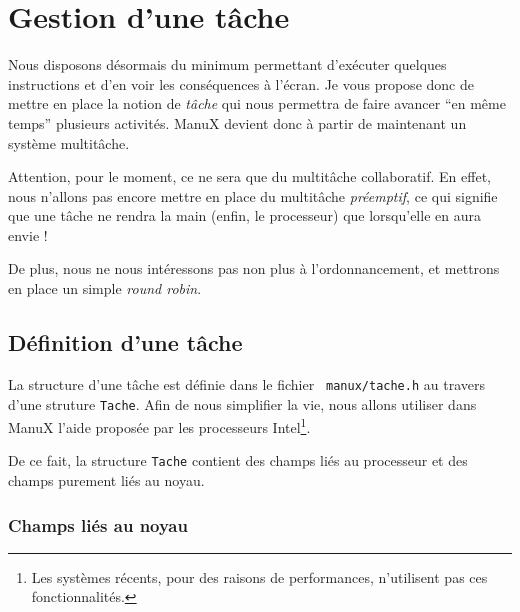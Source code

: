 \section{Gestion d'une tâche}

   Nous disposons désormais du minimum permettant d'exécuter quelques
instructions et d'en voir les conséquences à l'écran. Je vous propose
donc de mettre en place la notion de {\em tâche} qui nous permettra de
faire avancer ``en même temps'' plusieurs activités. ManuX devient
donc à partir de maintenant un système multitâche.

   Attention, pour le moment, ce ne sera que du multitâche
collaboratif. En effet, nous n'allons pas encore mettre en place du
multitâche {\em préemptif}, ce qui signifie que une tâche ne rendra la
main (enfin, le processeur) que lorsqu'elle en aura envie !

   De plus, nous ne nous intéressons pas non plus à l'ordonnancement,
et mettrons en place un simple {\em round robin}.

\subsection{Définition d'une tâche}

   La structure d'une tâche est définie dans le fichier {\tt
manux/tache.h} au travers d'une struture \lstinline!Tache!. Afin de
nous simplifier la vie, nous allons utiliser dans ManuX l'aide
proposée par les processeurs Intel\footnote{Les systèmes récents, pour
  des raisons de performances, n'utilisent pas ces fonctionnalités.}.

   De ce fait, la structure \lstinline!Tache! contient des champs liés
au processeur et des champs purement liés au noyau.

%
\subsubsection{Champs liés au noyau}

